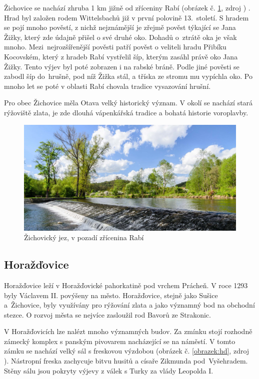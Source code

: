 \documentclass[thesis=M,czech]{FITthesis}[2012/06/26]
\begin{document}
Žichovice se nachází zhruba 1 km jižně od zříceniny Rabí (obrázek č. \ref{obrazek:zichovice}, zdroj \cite{rabi_foto}) . Hrad byl založen rodem Wittelsbachů již v první polovině 13.~století. S hradem se pojí mnoho pověstí, z nichž nejznámější je zřejmě pověst týkající se Jana Žižky, který zde údajně přišel o své druhé oko. Dohadů o~ztrátě oka je však mnoho. Mezi~nejrozšířenější pověsti patří pověst o veliteli hradu Přibíku Kocovském, který z hradeb Rabí vystřelil šíp, kterým zasáhl právě oko Jana Žižky. Tento výjev byl poté zobrazen i na rabské bráně. Podle jiné pověsti se zabodl šíp do~hrušně, pod níž Žižka stál, a tříska ze stromu mu vypíchla oko. Po mnoho let se poté v oblasti Rabí chovala tradice vysazování hrušní. \cite{rabi}

Pro obec Žichovice měla Otava velký historický význam. V okolí se nachází stará rýžoviště zlata, je zde dlouhá vápenkářská tradice a bohatá historie voroplavby.

\begin{figure}[h!]
	\centering
	\includegraphics[width=12cm]{pics/zichovice.jpg}
	\caption{Žichovický jez, v pozadí zřícenina Rabí}
	\label{obrazek:zichovice}
\end{figure}

\subsection{Horažďovice}
Horažďovice leží v Horažďovické pahorkatině pod vrchem Prácheň. V roce 1293 byly Václavem II. povýšeny na město. Horažďovice, stejně jako Sušice a~Žichovice, byly využívány pro rýžování zlata a jako významný bod na obchodní stezce. O rozvoj města se nejvíce zasloužil rod Bavorů ze Strakonic. 

V Horažďovicích lze nalézt mnoho významných budov. Za zmínku stojí rozhodně zámecký komplex s panským pivovarem nacházející se na náměstí. V tomto zámku se nachází velký sál s freskovou výzdobou  (obrázek č. \ref{obrazek:hd}, zdroj \cite{hd}). Nástropní freska zachycuje bitvu husitů a císaře Zikmunda pod~Vyšehradem. Stěny sálu jsou pokryty výjevy z válek s Turky za vlády Leopolda I.  \cite{obce}\cite{hd}
\end{document}
